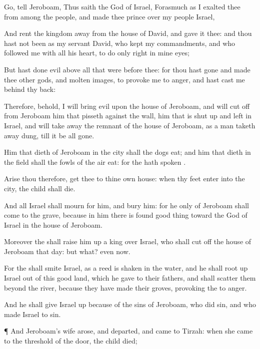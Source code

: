 {\par }{\PP {}Go,
tell
Jeroboam, Thus
saith the
{}
God of
Israel, Forasmuch
as I
exalted thee from
among the
people, and
made thee
prince over my
people
Israel,

And
rent the
kingdom
away from the
house of
David, and
gave it thee: and
{} thou hast not been as my
servant
David, who
kept my
commandments, and who
followed me with all his
heart, to
do
{} only
{}
right in mine
eyes;

But hast
done
evil above all that were
before thee: for thou hast
gone and
made thee
other
gods, and molten
images, to provoke me to
anger, and hast
cast me
behind thy
back:

Therefore, behold, I will
bring
evil upon the
house of
Jeroboam, and will cut
off from
Jeroboam him that
pisseth against the
wall,
{} him that is shut
up and
left in
Israel, and will take
away the
remnant of the
house of
Jeroboam, as a man taketh
away
dung, till it be all
gone.

Him that
dieth of
Jeroboam in the
city shall the
dogs
eat; and him that
dieth in the
field shall the
fowls of the
air
eat: for the
{} hath
spoken
{}.

Arise thou therefore,
get thee to thine own
house:
{} when thy
feet
enter into the
city, the
child shall
die.

And all
Israel shall
mourn for him, and
bury him: for he only of
Jeroboam shall
come to the
grave, because in him there is
found
{}
good
thing toward the
{}
God of
Israel in the
house of
Jeroboam.

Moreover the
{} shall raise him
up a
king over
Israel, who shall cut
off the
house of
Jeroboam that
day: but what? even now.

For the
{} shall
smite
Israel, as a
reed is
shaken in the
water, and he shall root
up
Israel out of this
good
land, which he
gave to their
fathers, and shall
scatter them
beyond the
river, because they have
made their
groves, provoking the
{} to
anger.

And he shall
give
Israel
up
because of the
sins of
Jeroboam, who did
sin, and who made
Israel to
sin.


\par }{\PP {}¶ And
Jeroboam’s
wife
arose, and
departed, and
came to
Tirzah:
{} when she
came to the
threshold of the
door, the
child
died;

}
